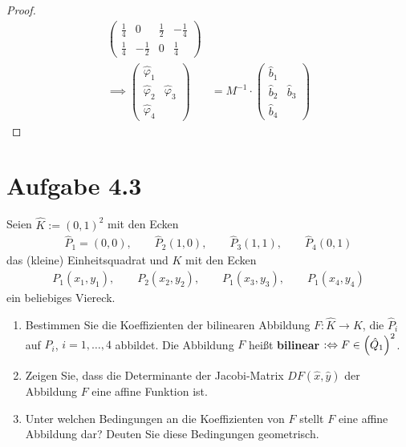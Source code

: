 \documentclass[12pt,a4paper]{article}
\begin{document}
\begin{proof}
\begin{align*}
\begin{pmatrix}
\frac{1}{4} & 0 & \frac{1}{2} & -\frac{1}{4}\\
\frac{1}{4} & -\frac{1}{2} & 0 & \frac{1}{4}
\end{pmatrix}\\
\implies\begin{pmatrix}
\hat{\varphi}_1\\ \hat{\varphi}_2 & \hat{\varphi}_3 \\ \hat{\varphi}_4
\end{pmatrix}&=M^{-1}\cdot\begin{pmatrix}
\hat{b}_1\\ \hat{b}_2 & \hat{b}_3 \\ \hat{b}_4
\end{pmatrix}
\end{align*}
	
\end{proof}

\section*{Aufgabe 4.3}
Seien $\hat{K}:=(0,1)^2$ mit den Ecken 
\begin{align*}
\hat{P}_1=(0,0),\qquad
\hat{P}_2(1,0),\qquad
\hat{P}_3(1,1),\qquad
\hat{P}_4(0,1)
\end{align*}
das (kleine) Einheitsquadrat und $K$ mit den Ecken
\begin{align*}
P_1(x_1,y_1),\qquad
P_2(x_2,y_2),\qquad
P_1(x_3,y_3),\qquad
P_1(x_4,y_4)
\end{align*}
ein beliebiges Viereck.
\begin{enumerate}[label=(\alph*)]
\item Bestimmen Sie die Koeffizienten der bilinearen Abbildung $F:\hat{K}\to K$, die $\hat{P}_i$ auf $P_i$, $i=1,\ldots,4$ abbildet. Die Abbildung $F$ heißt \textbf{bilinear} $:\Leftrightarrow F\in\left(\hat{Q}_1\right)^2$.
\item Zeigen Sie, dass die Determinante der Jacobi-Matrix $DF(\hat{x},\hat{y})$ der Abbildung $F$ eine affine Funktion ist.
\item Unter welchen Bedingungen an die Koeffizienten von $F$ stellt $F$ eine affine Abbildung dar? Deuten Sie diese Bedingungen geometrisch.
\end{enumerate}
\end{document}
